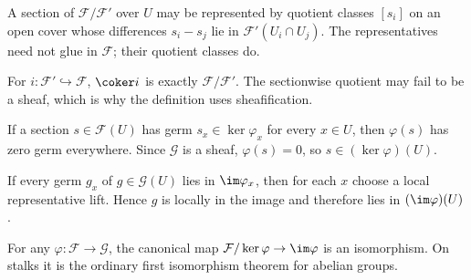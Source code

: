 \begin{example}
A section of $\mathcal F/\mathcal F'$ over $U$ may be represented by quotient classes $[s_i]$ on an open cover whose differences $s_i-s_j$ lie in $\mathcal F'(U_i\cap U_j)$. The representatives need not glue in $\mathcal F$; their quotient classes do.
\end{example}

\begin{example}
For $i:\mathcal F'\hookrightarrow\mathcal F$, $\coker i$ is exactly $\mathcal F/\mathcal F'$. The sectionwise quotient may fail to be a sheaf, which is why the definition uses sheafification.
\end{example}

\begin{example}
If a section $s\in\mathcal F(U)$ has germ $s_x\in\ker\varphi_x$ for every $x\in U$, then $\varphi(s)$ has zero germ everywhere. Since $\mathcal G$ is a sheaf, $\varphi(s)=0$, so $s\in(\ker\varphi)(U)$.
\end{example}

\begin{example}
If every germ $g_x$ of $g\in\mathcal G(U)$ lies in $\im\varphi_x$, then for each $x$ choose a local representative lift. Hence $g$ is locally in the image and therefore lies in $(\im\varphi)(U)$.
\end{example}

\begin{example}
For any $\varphi:\mathcal F\to\mathcal G$, the canonical map $\mathcal F/\ker\varphi\to\im\varphi$ is an isomorphism. On stalks it is the ordinary first isomorphism theorem for abelian groups.
\end{example}
